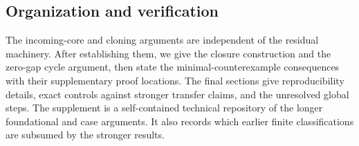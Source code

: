 

\subsection{Organization and verification}
The incoming-core and cloning arguments are independent of the residual
machinery. After establishing them, we give the closure construction and the
zero-gap cycle argument, then state the minimal-counterexample consequences
with their supplementary proof locations. The final sections give reproducibility
details, exact controls against stronger transfer claims, and the unresolved
global steps. The supplement is a self-contained technical repository of the
longer foundational and case arguments. It also records which earlier finite
classifications are subsumed by the stronger results.
